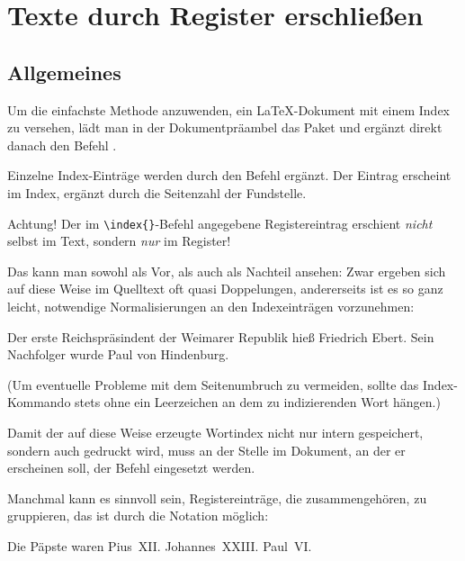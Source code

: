 \chapter{Texte durch Register erschließen}
 

\section{Allgemeines}

Um die einfachste Methode anzuwenden, ein \LaTeX{}-Dokument mit einem Index zu versehen, lädt man
in der Dokumentpräambel das Paket  und ergänzt direkt danach den Befehl 
.

Einzelne Index-Einträge werden durch den Befehl  ergänzt. 
Der Eintrag erscheint im Index, ergänzt durch die Seitenzahl der Fundstelle.

Achtung! Der im \lstinline/\index{}/-Befehl angegebene Registereintrag erschient \emph{nicht} selbst
im Text, sondern \emph{nur} im Register!

Das kann man sowohl als Vor, als auch als Nachteil ansehen:
Zwar ergeben sich auf diese Weise im Quelltext oft quasi Doppelungen, andererseits ist es so ganz 
leicht, notwendige Normalisierungen an den Indexeinträgen vorzunehmen:

\begin{lfgwcode}{}
    Der erste Reichspräsindent der Weimarer Republik hieß Friedrich Ebert.
    Sein Nachfolger wurde Paul von Hindenburg.
\end{lfgwcode}

(Um eventuelle Probleme mit dem Seitenumbruch zu vermeiden, sollte das Index-Kommando stets ohne
ein Leerzeichen an dem zu indizierenden Wort hängen.)

Damit der auf diese Weise erzeugte Wortindex nicht nur intern gespeichert, sondern auch gedruckt
wird, muss an der Stelle im Dokument, an der er erscheinen soll, der Befehl 
eingesetzt werden. 


Manchmal kann es sinnvoll sein, Registereinträge, die zusammengehören, zu gruppieren,
das ist durch die Notation  möglich:
    
\begin{lfgwcode}{}
    Die Päpste waren 
    Pius~XII.
    Johannes~XXIII.
    Paul~VI.
\end{lfgwcode}    


